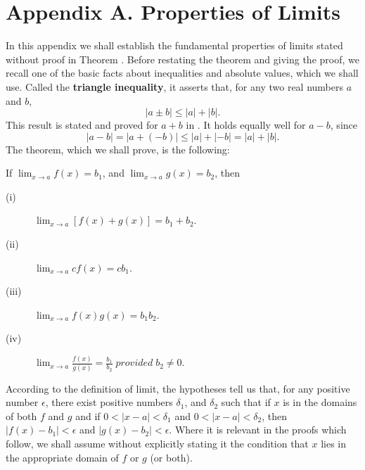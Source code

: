 \chapter*{Appendix A.  Properties of Limits}

In this appendix we shall establish the fundamental properties of
limits stated without proof in
Theorem .
Before restating the theorem and giving the proof,
we recall one of the basic facts about inequalities and absolute values,
which we shall use.
Called the \textbf{triangle inequality}, it asserts that,
for any two real numbers $a$ and $b$,
$$
|a \pm b| \leq |a| + |b|.
$$
This result is stated and proved for $a + b$ in .
It holds equally well for $a - b$, since
$$
|a - b| = |a + (-b)| \leq |a| + |-b| = |a| + |b|.
$$
The theorem, which we shall prove, is the following:

\begin{theorem}
If $\lim_{x \rightarrow a} f(x) = b_1$,
and $\lim_{x \rightarrow a} g(x) = b_2$, then 

\begin{description}
\item[(i)] $\lim_{x \rightarrow a} [f(x) + g(x)] = b_1 + b_2$. 
\item[(ii)] $\lim_{x \rightarrow a} cf(x) = cb_1$.  
\item[(iii)] $\lim_{x \rightarrow a} f(x)g(x) = b_1b_2$.
\item[(iv)] $\lim_{x \rightarrow a} \frac{f(x)}{g(x)} = \frac{b_1}{b_2} \;provided \; b_2 \neq 0$.
\end{description}
\end{theorem}

According to the definition of limit, the hypotheses tell us that, for any positive number $\epsilon$, there exist positive numbers $\delta_1$, and $\delta_2$ such that if $x$ is in the domains of both $f$ and $g$ and if $0 < |x - a| < \delta_1$ and $0 < |x - a| < \delta_2$, then $|f(x) - b_1| < \epsilon$ and $|g(x) - b_2| < \epsilon$. Where it is relevant in the proofs which follow, we shall assume without explicitly stating it the condition that $x$ lies in the appropriate domain of $f$ or $g$ (or both).
\medskip

